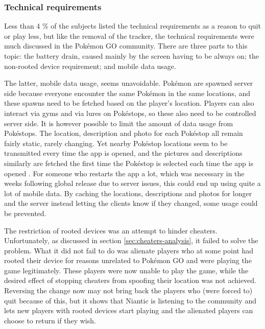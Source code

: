 \subsubsection{Technical requirements}
Less than 4 \% of the subjects listed the technical requirements as a reason to quit or play less, but like the removal of the tracker, the technical requirements were much discussed in the Pokémon GO community. There are three parts to this topic: the battery drain, caused mainly by the screen having to be always on; the non-rooted device requirement; and mobile data usage.

The latter, mobile data usage, seems unavoidable. Pokémon are spawned server side because everyone encounter the same Pokémon in the same locations, and these spawns need to be fetched based on the player's location. Players can also interact via gyms and via lures on Pokéstops, so these also need to be controlled server side. It is however possible to limit the amount of data usage from Pokéstops. The location, description and photo for each Pokéstop all remain fairly static, rarely changing. Yet nearby Pokéstop locations seem to be transmitted every time the app is opened, and the pictures and descriptions similarly are fetched the first time the Pokéstop is selected each time the app is opened . For someone who restarts the app a lot, which was necessary in the weeks following global release due to server issues, this could end up using quite a lot of mobile data. By caching the locations, descriptions and photos for longer and the server instead letting the clients know if they changed, some usage could be prevented.

The restriction of rooted devices  was an attempt to hinder cheaters. Unfortunately, as discussed in section \ref{sec:cheaters-analysis}, it failed to solve the problem. What it did not fail to do was alienate players who at some point had rooted their device for reasons unrelated to Pokémon GO and were playing the game legitimately. These players were now unable to play the game, while the desired effect of stopping cheaters from spoofing their location was not achieved. Reversing the change now may not bring back the players who (were forced to) quit because of this, but it shows that Niantic is listening to the community and lets new players with rooted devices start playing and the alienated players can choose to return if they wish.

